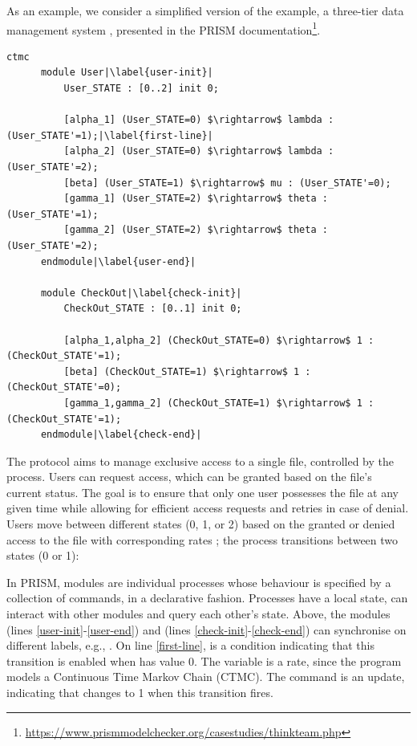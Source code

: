 As an example, we consider a simplified version of the
 example, a three-tier data management system
\cite{DBLP:journals/entcs/BeekMLGFS05}, presented in the PRISM
documentation\footnote{\url{https://www.prismmodelchecker.org/casestudies/thinkteam.php}}.
%
\begin{lstlisting}[style=prism-color,% caption={A PRISM example},captionpos=b,
	frame=none,label={example1},escapechar=|]
	  ctmc 
	  module User|\label{user-init}|
		  User_STATE : [0..2] init 0;
	  
		  [alpha_1] (User_STATE=0) $\rightarrow$ lambda : (User_STATE'=1);|\label{first-line}|
		  [alpha_2] (User_STATE=0) $\rightarrow$ lambda : (User_STATE'=2);
		  [beta] (User_STATE=1) $\rightarrow$ mu : (User_STATE'=0);
		  [gamma_1] (User_STATE=2) $\rightarrow$ theta : (User_STATE'=1);
		  [gamma_2] (User_STATE=2) $\rightarrow$ theta : (User_STATE'=2);
	  endmodule|\label{user-end}|
	  
	  module CheckOut|\label{check-init}|
		  CheckOut_STATE : [0..1] init 0;
	  
		  [alpha_1,alpha_2] (CheckOut_STATE=0) $\rightarrow$ 1 : (CheckOut_STATE'=1);
		  [beta] (CheckOut_STATE=1) $\rightarrow$ 1 : (CheckOut_STATE'=0);
		  [gamma_1,gamma_2] (CheckOut_STATE=1) $\rightarrow$ 1 : (CheckOut_STATE'=1);
	  endmodule|\label{check-end}|
  \end{lstlisting}
  The protocol aims to manage exclusive access to a single file,
  controlled by the  process. Users can request
  access, which can be granted based on the file's current status. The
  goal is to ensure that only one user possesses the file at any given
  time while allowing for efficient access requests and retries in
  case of denial. Users move between different states (0, 1, or 2)
  based on the granted or denied access to the file with corresponding
  rates ; the  process
  transitions between two states (0 or 1):

In PRISM, modules are individual processes whose behaviour is
specified by a collection of commands, in a declarative fashion.
Processes have a local state, can interact with other modules and
query each other's state. Above, the modules  (lines
\ref{user-init}-\ref{user-end}) and  (lines
\ref{check-init}-\ref{check-end}) can synchronise on different labels, e.g., 
. 
On line \ref{first-line},  is a condition
indicating that this transition is enabled when 
has value 0. The variable  is a rate, since the
program models a Continuous Time Markov Chain (CTMC). The command
 is an update, indicating that
 changes to 1 when this transition fires.

